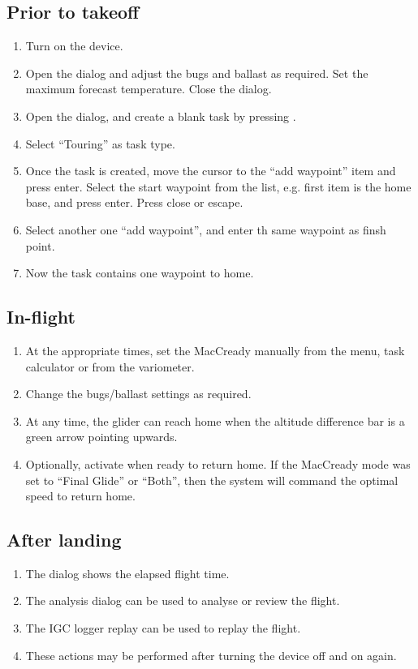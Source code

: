 \documentclass[a4paper,12pt]{refrep}
\begin{document}
\subsection*{Prior to takeoff}
\begin{enumerate}
\item  Turn on the device.
\item  Open the  dialog and adjust the bugs and ballast as
required. Set the maximum forecast temperature.  Close the dialog.
\item  Open the  dialog, and create a blank task by pressing
.
\item  Select ``Touring'' as  task type.
\item  Once the task is created, move the cursor to the ``add waypoint'' item
and press enter.  Select the start waypoint from the list, e.g. first item is the home base, and press enter.
Press close or escape.
\item Select another one ``add waypoint'', and enter th same waypoint as finsh
point.
\item  Now the task contains one waypoint to home.
\end{enumerate}

\subsection*{In-flight}
\begin{enumerate}
\item  At the appropriate times, set the MacCready manually from the menu,
  task calculator or from the variometer.
\item  Change the bugs/ballast settings as required.
\item  At any time, the glider can reach home when the altitude difference
  bar is a green arrow pointing upwards.
\item  Optionally, activate  when ready to return
home. If the MacCready mode was set to ``Final Glide'' or ``Both'', then the
system will command the optimal speed to return home.
\end{enumerate}

\subsection*{After landing}
\begin{enumerate}
\item  The  dialog shows the elapsed flight time.
\item  The analysis dialog can be used to analyse or review the flight.
\item  The IGC logger replay can be used to replay the flight.
\item  These actions may be performed after turning the device off and 
  on again. 
\end{enumerate}
\end{document}
